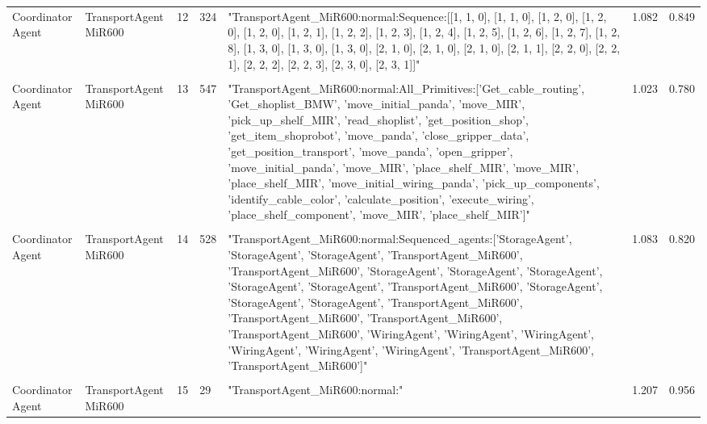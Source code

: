 \begin{table}[htbp]
\begin{tabular}{m{} m{} m{} m{} m{} m{} m{}}
    Coordinator Agent & TransportAgent MiR600 & 12 & 324 & "TransportAgent\_MiR600:normal:Sequence:{[}{[}1, 1, 0{]}, {[}1, 1, 0{]}, {[}1, 2, 0{]}, {[}1, 2, 0{]}, {[}1, 2, 0{]}, {[}1, 2, 1{]}, {[}1, 2, 2{]}, {[}1, 2, 3{]}, {[}1, 2, 4{]}, {[}1, 2, 5{]}, {[}1, 2, 6{]}, {[}1, 2, 7{]}, {[}1, 2, 8{]}, {[}1, 3, 0{]}, {[}1, 3, 0{]}, {[}1, 3, 0{]}, {[}2, 1, 0{]}, {[}2, 1, 0{]}, {[}2, 1, 0{]}, {[}2, 1, 1{]}, {[}2, 2, 0{]}, {[}2, 2, 1{]}, {[}2, 2, 2{]}, {[}2, 2, 3{]}, {[}2, 3, 0{]}, {[}2, 3, 1{]}{]}"                                                                                                                                                                                                                                      & 1.082 & 0.849 \\ 
    & & & & & &\\
    Coordinator Agent & TransportAgent MiR600 & 13 & 547 & "TransportAgent\_MiR600:normal:All\_Primitives:{[}'Get\_cable\_routing', 'Get\_shoplist\_BMW', 'move\_initial\_panda', 'move\_MIR', 'pick\_up\_shelf\_MIR', 'read\_shoplist', 'get\_position\_shop', 'get\_item\_shoprobot', 'move\_panda', 'close\_gripper\_data', 'get\_position\_transport', 'move\_panda', 'open\_gripper', 'move\_initial\_panda', 'move\_MIR', 'place\_shelf\_MIR', 'move\_MIR', 'place\_shelf\_MIR', 'move\_initial\_wiring\_panda', 'pick\_up\_components', 'identify\_cable\_color', 'calculate\_position', 'execute\_wiring', 'place\_shelf\_component', 'move\_MIR', 'place\_shelf\_MIR'{]}"                                                                  & 1.023 & 0.780 \\ 
    & & & & & &\\
    Coordinator Agent & TransportAgent MiR600 & 14 & 528 & "TransportAgent\_MiR600:normal:Sequenced\_agents:{[}'StorageAgent', 'StorageAgent', 'StorageAgent', 'TransportAgent\_MiR600', 'TransportAgent\_MiR600', 'StorageAgent', 'StorageAgent', 'StorageAgent', 'StorageAgent', 'StorageAgent', 'TransportAgent\_MiR600', 'StorageAgent', 'StorageAgent', 'StorageAgent', 'TransportAgent\_MiR600', 'TransportAgent\_MiR600', 'TransportAgent\_MiR600', 'TransportAgent\_MiR600', 'WiringAgent', 'WiringAgent', 'WiringAgent', 'WiringAgent', 'WiringAgent', 'WiringAgent', 'TransportAgent\_MiR600', 'TransportAgent\_MiR600'{]}" & 1.083 & 0.820 \\ 
    & & & & & &\\
    Coordinator Agent & TransportAgent MiR600 & 15 & 29  & "TransportAgent\_MiR600:normal:"                                                                                                                                                                                                                                                                                                                                                                                                                                                                                                                                                                                                                                                         & 1.207 & 0.956 \\ 

\end{tabular}
\end{table}
